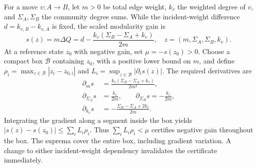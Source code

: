 For a move $v:A\to B$, let $m>0$ be total edge weight, $k_v$ the weighted
degree of $v$, and $\Sigma_A,\Sigma_B$ the community degree sums.
While the incident-weight difference $d=k_{v,B}-k_{v,A}$ is fixed,
the scaled modularity gain is
\[
s(z)=m\Delta Q=d-\frac{k_v(\Sigma_B-\Sigma_A+k_v)}{2m},
\quad z=(m,\Sigma_A,\Sigma_B,k_v).
\]
At a reference state $z_0$ with negative gain, set $\mu=-s(z_0)>0$.
Choose a compact box $\mathcal B$ containing $z_0$, with a positive lower
bound on $m$, and define
$\rho_i=\max_{z\in\mathcal B}|z_i-z_{0,i}|$ and
$L_i=\sup_{z\in\mathcal B}|\partial_i s(z)|$.
The required derivatives are
\[
\begin{aligned}
\partial_m s&=\frac{k_v(\Sigma_B-\Sigma_A+k_v)}{2m^2},\\
\partial_{\Sigma_A}s&=\frac{k_v}{2m},\qquad
\partial_{\Sigma_B}s=-\frac{k_v}{2m},\\
\partial_{k_v}s&=-\frac{\Sigma_B-\Sigma_A+2k_v}{2m}.
\end{aligned}
\]
Integrating the gradient along a segment inside the box yields
$|s(z)-s(z_0)|\le\sum_iL_i\rho_i$. Thus
$\sum_iL_i\rho_i<\mu$ certifies negative gain throughout the box.
The suprema cover the entire box, including gradient variation. A change
to either incident-weight dependency invalidates the certificate immediately.
